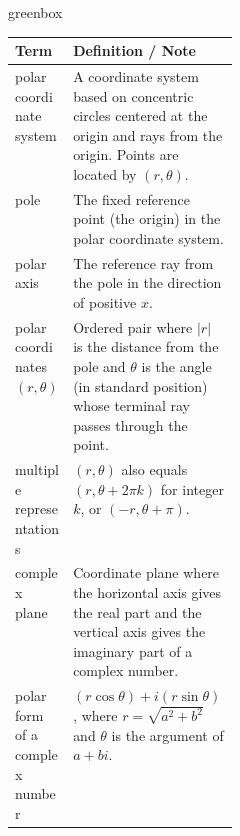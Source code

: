 \documentclass[10pt]{article}
\begin{document}
\begin{skillbox}{greenbox}
\begin{tabularx}{\linewidth}{@{} p{0.26\linewidth} X @{}}
\textbf{Term} & \textbf{Definition / Note} \\
\midrule
polar coordinate system &
  A coordinate system based on concentric circles centered at the origin
  and rays from the origin. Points are located by $(r,\theta)$. \\[4pt]
pole &
  The fixed reference point (the origin) in the polar coordinate system. \\[4pt]
polar axis &
  The reference ray from the pole in the direction of positive $x$. \\[4pt]
polar coordinates $(r,\theta)$ &
  Ordered pair where $|r|$ is the distance from the pole and $\theta$ is
  the angle (in standard position) whose terminal ray passes through the point. \\[4pt]
multiple representations &
  $(r,\theta)$ also equals $(r,\theta+2\pi k)$ for integer $k$, or $(-r,\theta+\pi)$. \\[4pt]
complex plane &
  Coordinate plane where the horizontal axis gives the real part and the
  vertical axis gives the imaginary part of a complex number. \\[4pt]
polar form of a complex number &
  $(r\cos\theta)+i(r\sin\theta)$, where $r = \sqrt{a^2+b^2}$ and $\theta$ is the
  argument of $a+bi$. \\
\end{tabularx}
\end{skillbox}

\vspace{0.08in}
\end{document}
